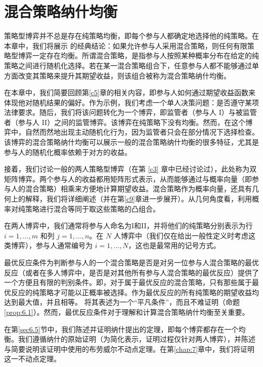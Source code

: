 \chapter{混合策略纳什均衡}  \label{c6}

策略型博弈并不总是存在纯策略均衡，即每个参与人都确定地选择他的纯策略。在本章中，我们将展示 \citet{nash1951} 的经典结论：如果允许参与人采用混合策略，则任何有限策略型博弈一定存在均衡。所谓混合策略，是指参与人按照某种概率分布在给定的纯策略之间进行随机化选择。若在某一混合策略组合下，任意参与人都不能够通过单方面改变其策略来提升其期望收益，则该组合被称为混合策略纳什均衡。

在本章中，我们简要回顾第\ref{c5}章的相关内容，即参与人如何通过期望收益函数来体现他对随机结果的偏好。作为示例，我们考虑一个单人决策问题：是否遵守某项法律要求。随后，我们将该问题转化为一个博弈，即监管者（参与人 I）与被监管者（参与人 II）之间的监管博弈。该博弈在纯策略下没有均衡。然而，在这个博弈中，自然而然地出现主动随机化行为，因为监管者只会在部分情况下选择检查。该博弈的混合策略纳什均衡可以展示一般的混合策略纳什均衡的很多特征，尤其是参与人的随机化概率依赖于对方的收益。

接着，我们讨论一般的两人策略型博弈（在第 \ref{c3} 章中已经讨论过），此处称为双矩阵博弈。两个参与人的收益都用矩阵形式表示，从而能够通过与概率向量（即参与人的混合策略）相乘来方便地计算期望收益。混合策略作为概率向量，还具有几何上的解释，我们将详细阐述（并在第\ref{c9}章进一步展开）。从几何角度看，利用概率对纯策略进行混合等同于取这些策略的凸组合。

在两人博弈中，我们通常将参与人命名为I和II，并将他们的纯策略分别表示为行 \(i = 1,\ldots,m\) 和列 \(j = 1,\ldots,n\)。在 \(N\) 人博弈中（我们仅在给出一般性定义时考虑这类博弈），参与人通常编号为 \(i = 1,\ldots,N\)，这也是最常用的记号方式。

最优反应条件为判断参与人的一个混合策略是否是对另一位参与人混合策略的最优反应（或者在多人博弈中，是否是对其他所有参与人混合策略的最优反应）提供了一个方便且有限的判别条件。即，对于属于最优反应的混合策略，只有那些属于最优反应的纯策略才可能以正概率被选择。作为最优反应的所有纯策略的期望收益均达到最大值，并且相等。\citet[p.~287]{nash1951} 将其表述为一个“平凡条件”，而且不难证明（命题\ref{prop:6.1}）。然而，最优反应条件对于理解和计算混合策略纳什均衡至关重要。

在第\ref{sec6.5}节中，我们陈述并证明纳什提出的定理，即每个博弈都存在一个均衡。我们遵循纳什的原始证明（为简化表示，证明过程仅针对两人博弈），并陈述与简要说明该证明中使用的布劳威尔不动点定理。在第\ref{chap:7}章中，我们将证明这一不动点定理。


